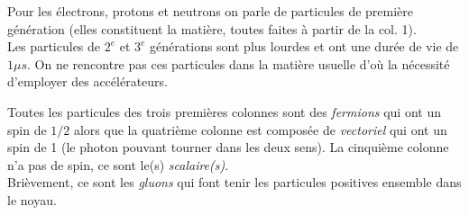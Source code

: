 \documentclass	[11pt, a4paper, openany]{book}
\begin{document}
Pour les électrons, protons et neutrons on parle de particules de première génération (elles constituent la matière, toutes faites à partir de la col. 1).\\
Les particules de $2^e$ et $3^e$ générations sont plus lourdes et ont une durée de vie de $1 \mu s$. On ne rencontre pas ces particules dans la matière usuelle d'où la nécessité d'employer des accélérateurs.\\
\begin{center}
\end{center}
Toutes les particules des trois premières colonnes sont des \textit{fermions} qui ont un spin de $1/2$ alors que la quatrième colonne est composée de \textit{vectoriel} qui ont un spin de 1 (le photon pouvant tourner dans les deux sens). La cinquième colonne n'a pas de spin, ce sont le(s) \textit{scalaire(s)}.\\
Brièvement, ce sont les \textit{gluons} qui font tenir les particules positives ensemble dans le noyau.
\end{document}
